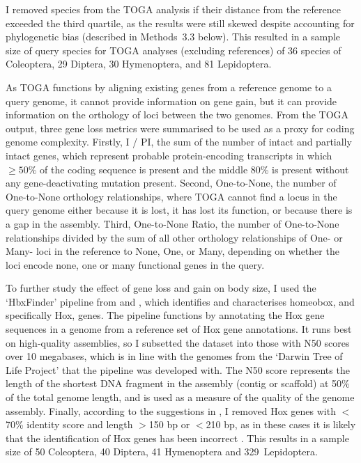 \documentclass[11pt]{article}
\begin{document}
I removed species from the TOGA analysis if their distance from the reference exceeded the third quartile, as the results were still skewed despite accounting for phylogenetic bias (described in Methods~3.3 below). This resulted in a sample size of query species for TOGA analyses (excluding references) of 36 species of Coleoptera,  29 Diptera, 30 Hymenoptera, and 81 Lepidoptera.

As TOGA functions by aligning existing genes from a reference genome to a query genome, it cannot provide information on gene gain, but it can provide information on the orthology of loci between the two genomes. From the TOGA output, three gene loss metrics were summarised to be used as a proxy for coding genome complexity. Firstly, I / PI, the sum of the number of intact and partially intact genes, which represent probable protein-encoding transcripts in which $\geq50\%$ of the coding sequence is present and the middle 80\% is present without any gene-deactivating mutation present. Second, One-to-None, the number of One-to-None orthology relationships, where TOGA cannot find a locus in the query genome either because it is lost, it has lost its function, or because there is a gap in the assembly. Third, One-to-None Ratio, the number of One-to-None relationships divided by the sum of all other orthology relationships of One- or Many- loci in the reference to None, One, or Many, depending on whether the loci encode none, one or many functional genes in the query.

To further study the effect of gene loss and gain on body size, I used the `HbxFinder' pipeline from \cite{hbxfinder1} and \cite{hbxfinder2}, which identifies and characterises homeobox, and specifically Hox, genes. The pipeline functions by annotating the Hox gene sequences in a genome from a reference set of Hox gene annotations. It runs best on high-quality assemblies, so I subsetted the dataset into those with N50 scores over 10 megabases, which is in line with the genomes from the `Darwin Tree of Life Project' that the pipeline was developed with. The N50 score represents the length of the shortest DNA fragment in the assembly (contig or scaffold) at 50\% of the total genome length, and is used as a measure of the quality of the genome assembly. Finally, according to the suggestions in \cite{hbxfinder2}, I removed Hox genes with $<$70\% identity score and length $>$150 bp or $<$210 bp, as in these cases it is likely that the identification of Hox genes has been incorrect \citep{hox-length}. This results in a sample size of 50 Coleoptera, 40 Diptera, 41 Hymenoptera and 329~Lepidoptera.
\end{document}
